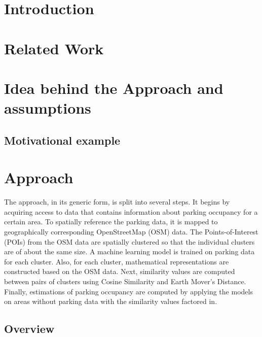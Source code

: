 \documentclass{ws-ijait}
\begin{document}
	\section{Introduction}
	
	\section{Related Work}
	
	\section{Idea behind the Approach and assumptions}
	
	\subsection{Motivational example}
		
	\section{Approach}
	The approach, in its generic form, is split into several steps. It begins by acquiring access to data that contains information about parking occupancy for a certain area. To spatially reference the parking data, it is mapped to geographically corresponding OpenStreetMap (OSM) data. The Points-of-Interest (POIs) from the OSM data are spatially clustered so that the individual clusters are of about the same size. A machine learning model is trained on parking data for each cluster. Also, for each cluster, mathematical representations are constructed based on the OSM data. Next, similarity values are computed between pairs of clusters using Cosine Similarity and Earth Mover's Distance. Finally, estimations of parking occupancy are computed by applying the models on areas without parking data with the similarity values factored in.   
	
	\subsection{Overview}
	
\end{document}
